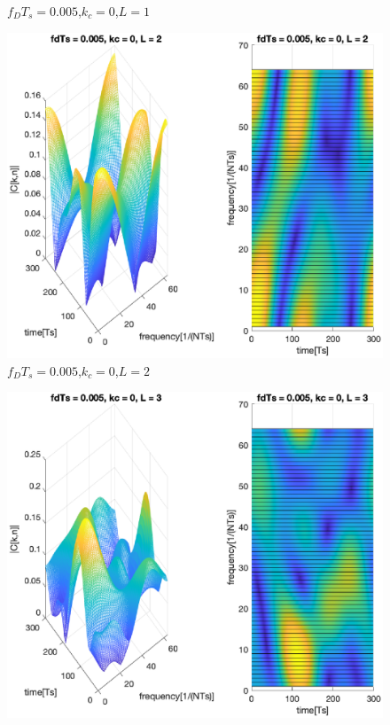 \documentclass[conference]{IEEEtran}
\begin{document}
\begin{appendices}
\begin{figure}[H]
        \caption{$f_{D}T_{s}=0.005$,$k_{c}=0$,$L=1$}
        \label{0005_0_1}
    \end{figure}
    \begin{figure}[H]
        \centering
        \includegraphics[width=\linewidth]{Task2/0005_0_2.eps}
        \caption{$f_{D}T_{s}=0.005$,$k_{c}=0$,$L=2$}
        \label{0005_0_2}
    \end{figure}
    \begin{figure}[H]
        \centering
        \includegraphics[width=\linewidth]{Task2/0005_0_3.eps}

\end{figure}
\end{appendices}
\end{document}
